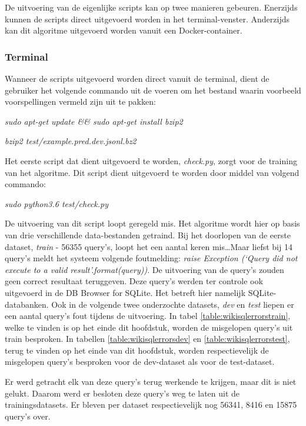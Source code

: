 De uitvoering van de eigenlijke scripts kan op twee manieren gebeuren. Enerzijds kunnen de scripts direct uitgevoerd worden in het terminal-venster. Anderzijds kan dit algoritme uitgevoerd worden vanuit een Docker-container.

\subsubsection{Terminal}

Wanneer de scripts uitgevoerd worden direct vanuit de terminal, dient de gebruiker het volgende commando uit de voeren om het bestand waarin voorbeeld voorspellingen vermeld zijn uit te pakken:
\begin{center}
	\textit{sudo apt-get update \&\& sudo apt-get install bzip2}
\end{center}
\begin{center}
	\textit{bzip2 test/example.pred.dev.jsonl.bz2}
\end{center}

Het eerste script dat dient uitgevoerd te worden, \textit{check.py}, zorgt voor de training van het algoritme. Dit script dient uitgevoerd te worden door middel van volgend commando:
\begin{center}
	\textit{sudo python3.6 test/check.py}
\end{center}

De uitvoering van dit script loopt geregeld mis. Het algoritme wordt hier op basis van drie verschillende data-bestanden getraind. Bij het doorlopen van de eerste dataset, \textit{train} - 56355 query's, loopt het een aantal keren mis\dots Maar liefst bij 14 query's meldt het systeem volgende foutmelding: \textit{raise Exception (‘Query {} did not execute to a valid result’.format(query))}. De uitvoering van de query's zouden geen correct resultaat teruggeven. Deze query's werden ter controle ook uitgevoerd in de DB Browser for SQLite. Het betreft hier namelijk SQLite-databanken. Ook in de volgende twee onderzochte datasets, \textit{dev} en \textit{test} liepen er een aantal query's fout tijdens de uitvoering. In tabel \ref{table:wikisqlerrorstrain}, welke te vinden is op het einde dit hoofdstuk, worden de misgelopen query's uit train besproken. In tabellen \ref{table:wikisqlerrorsdev} en \ref{table:wikisqlerrorstest}, terug te vinden op het einde van dit hoofdstuk, worden respectievelijk de misgelopen query's besproken voor de dev-dataset als voor de test-dataset.

Er werd getracht elk van deze query's terug werkende te krijgen, maar dit is niet gelukt. Daarom werd er besloten deze query's weg te laten uit de trainingsdatasets. Er bleven per dataset respectievelijk nog 56341, 8416 en 15875 query's over. 

